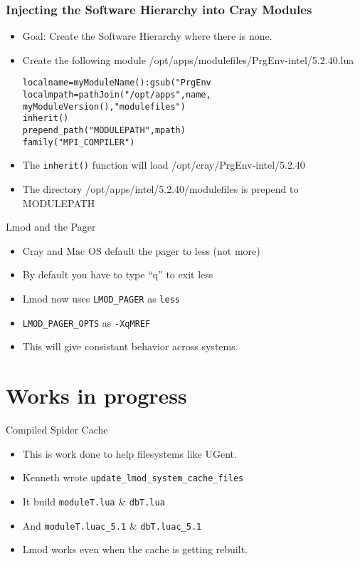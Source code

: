 \documentclass{beamer}
\begin{document}
\begin{frame}[fragile]
    \frametitle{Injecting the Software Hierarchy into Cray Modules}
  \begin{itemize}
    \item Goal: Create the Software Hierarchy where there is none.
    \item Create the following module /opt/apps/modulefiles/PrgEnv-intel/5.2.40.lua
  {\small
    \begin{alltt}

local name = myModuleName():gsub("PrgEnv%-","")
local mpath = pathJoin("/opt/apps",name,
              myModuleVersion(),"modulefiles")
inherit()
prepend_path("MODULEPATH",mpath)
family("MPI_COMPILER")
    \end{alltt}
}
    \item The \texttt{inherit()} function will load /opt/cray/PrgEnv-intel/5.2.40
    \item The directory /opt/apps/intel/5.2.40/modulefiles is prepend
      to MODULEPATH       
  \end{itemize}
\end{frame}

\begin{frame}{Lmod and the Pager}
  \begin{itemize}
    \item Cray and Mac OS default the pager to less (not more)
    \item By default you have to type ``q'' to exit less
    \item Lmod now uses \texttt{LMOD\_PAGER} as \texttt{less}
    \item \texttt{LMOD\_PAGER\_OPTS} as \texttt{-XqMREF}
    \item This will give consistant behavior across systems.
  \end{itemize}
\end{frame}


\section{Works in progress}

\begin{frame}{Compiled Spider Cache }
  \begin{itemize}
    \item This is work done to help filesystems like UGent.
    \item Kenneth wrote \texttt{update\_lmod\_system\_cache\_files}
    \item It build \texttt{moduleT.lua} \& \texttt{dbT.lua}
    \item And \texttt{moduleT.luac\_5.1} \& \texttt{dbT.luac\_5.1}
    \item Lmod works even when the cache is getting rebuilt.
  \end{itemize}
\end{frame}
\end{document}
